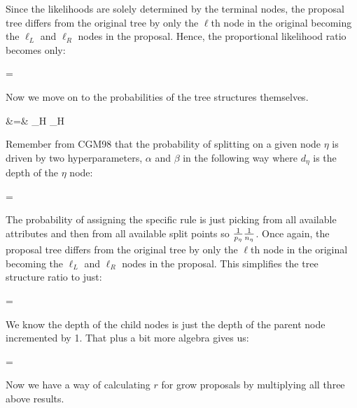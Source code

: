 Since the likelihoods are solely determined by the terminal nodes, the proposal tree differs from the original tree by only the $\ell$th node in the original becoming the $\ell_L$ and $\ell_R$ nodes in the proposal. Hence, the proportional likelihood ratio becomes only:

\beqn
{} = 
\eeqn

Now we move on to the probabilities of the tree structures themselves.

\beqn
{} &=& \prod_{\eta \in H}  \prod_{\eta \in H}  \\
\eeqn

Remember from CGM98 that the probability of splitting on a given node $\eta$ is driven by two hyperparameters, $\alpha$ and $\beta$ in the following way where $d_\eta$ is the depth of the $\eta$ node:

\beqn
{} = 
\eeqn

The probability of assigning the specific rule is just picking from all available attributes and then from all available split points so $\frac{1}{p_\eta}\frac{1}{n_\eta}$. Once again, the proposal tree differs from the original tree by only the $\ell$th node in the original becoming the $\ell_L$ and $\ell_R$ nodes in the proposal. This simplifies the tree structure ratio to just:

\beqn
{} =  
\eeqn

We know the depth of the child nodes is just the depth of the parent node incremented by 1. That plus a bit more algebra gives us:

\beqn
{} = \alpha {} 
\eeqn

Now we have a way of calculating $r$ for grow proposals by multiplying all three above results.\\

